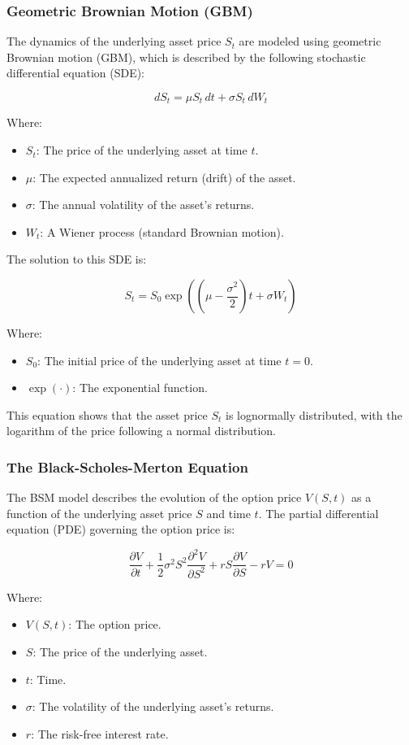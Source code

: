 \documentclass[11pt, oneside, a4paper, titlepage]{report}
\begin{document}
\subsubsection{Geometric Brownian Motion (GBM)}

The dynamics of the underlying asset price $S_t$ are modeled using geometric Brownian motion (GBM), which is described by the following stochastic differential equation (SDE):

\[
dS_t = \mu S_t \, dt + \sigma S_t \, dW_t
\]

Where:
\begin{itemize}
    \item $S_t$: The price of the underlying asset at time $t$.
    \item $\mu$: The expected annualized return (drift) of the asset.
    \item $\sigma$: The annual volatility of the asset's returns.
    \item $W_t$: A Wiener process (standard Brownian motion).
\end{itemize}

The solution to this SDE is:

\[
S_t = S_0 \exp\left(\left(\mu - \frac{\sigma^2}{2}\right)t + \sigma W_t\right)
\]

Where:
\begin{itemize}
    \item $S_0$: The initial price of the underlying asset at time $t = 0$.
    \item $\exp(\cdot)$: The exponential function.
\end{itemize}

This equation shows that the asset price $S_t$ is lognormally distributed, with the logarithm of the price following a normal distribution.


\subsubsection{The Black-Scholes-Merton Equation}

The BSM model describes the evolution of the option price \( V(S, t) \) as a function of the underlying asset price \( S \) and time \( t \). The partial differential equation (PDE) governing the option price is:

\[
\frac{\partial V}{\partial t} + \frac{1}{2} \sigma^2 S^2 \frac{\partial^2 V}{\partial S^2} + r S \frac{\partial V}{\partial S} - r V = 0
\]

Where:
\begin{itemize}
    \item \( V(S, t) \): The option price.
    \item \( S \): The price of the underlying asset.
    \item \( t \): Time.
    \item \( \sigma \): The volatility of the underlying asset's returns.
    \item \( r \): The risk-free interest rate.
\end{itemize}
\end{document}
